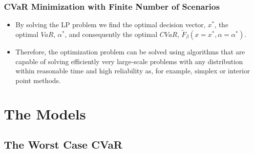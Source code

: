 \documentclass[pdf,9pt,xcolor=dvipsnames,hide notes]{beamer}
\begin{document}
\begin{frame}[label=frame2b9]
	\frametitle{CVaR Minimization with Finite Number of Scenarios}
	
	\begin{itemize}
		\justifying
		
		\item By solving the LP problem we
		find the optimal decision vector, $x^{\ast }$, the optimal $VaR$, $\alpha
		^{\ast }$, and consequently the optimal $CVaR$, $\widetilde{F}_{\beta
		}\left( x=x^{\ast },\alpha=\alpha ^{\ast }\right) $.
	
	\vspace{0.3cm}
	
	\item Therefore, the optimization problem can be solved using algorithms that are
	capable of solving efficiently very large-scale problems with any
	distribution within reasonable time and high reliability as, for example,
	simplex or interior point methods.
	
		
	\end{itemize}
	
\end{frame}

\section{The Models}
\subsection{The Worst Case CVaR}
\end{document}
